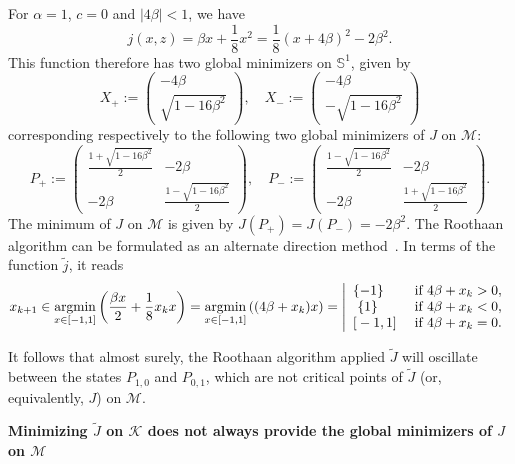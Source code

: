 \documentclass{article}
\newcommand{\1}{{\mathds 1}}
\begin{document}
\noindent
For $\alpha=1$, $c=0$ and $|4\beta| < 1$, we have 
$$
j(x,z)= \beta x + \frac 18 x^2 = \frac 18 (x+4\beta)^2 - 2 \beta^2.
$$
This function therefore has two global minimizers on $\mathbb S^1$, given by 
$$
X_+:=\left( \begin{array}{c} -4\beta \\ \sqrt{1-16\beta^2} \end{array} \right), \quad X_{-}:=\left( \begin{array}{c}  -4\beta \\ -\sqrt{1-16\beta^2} \end{array} \right)
$$
corresponding respectively to the following two global minimizers of $J$ on $\mathcal M$:
$$
P_+ :=\left( \begin{array}{cc} \frac{1+ \sqrt{1-16\beta^2}}2 & -2\beta  \\  -2\beta & \frac{1- \sqrt{1-16\beta^2}}2  \end{array} \right), \quad P_-:=\left( \begin{array}{cc} \frac{1- \sqrt{1-16\beta^2}}2 & -2\beta  \\  -2\beta & \frac{1+ \sqrt{1-16\beta^2}}2  \end{array} \right).
$$
The minimum of $J$ on $\mathcal M$ is given by $J(P_+)=J(P_-)=- 2 \beta^2$. The Roothaan algorithm can be formulated as an alternate direction method~\cite{cances2000c}. In terms of the function $\widetilde j$, it reads
$$
x_{k+1} \in  \mathop{\rm argmin}_{x \in [-1,1]} \left( \frac{\beta x}2 + \frac 18 x_kx \right) = \mathop{\rm argmin}_{x \in [-1,1]} \left( (4 \beta+x_k) x \right) = \left| \begin{array}{ll} \{-1\} & \mbox{ if } 4\beta + x_k > 0, \\\ \{1\} & \mbox{ if } 4\beta + x_k < 0, \\ {[}-1,1{]} & \mbox{ if } 4\beta + x_k = 0. \end{array} \right. 
$$

It follows that almost surely, the Roothaan algorithm applied $\widetilde J$ will oscillate between the states $P_{1,0}$ and $P_{0,1}$, which are not critical points of $\widetilde J$ (or, equivalently, $J$) on $\mathcal M$.


\medskip

\noindent
{\bf Minimizing $\widetilde J$ on $\mathcal K$ does not always provide the global minimizers of $J$ on $\mathcal M$}

\medskip
\end{document}
